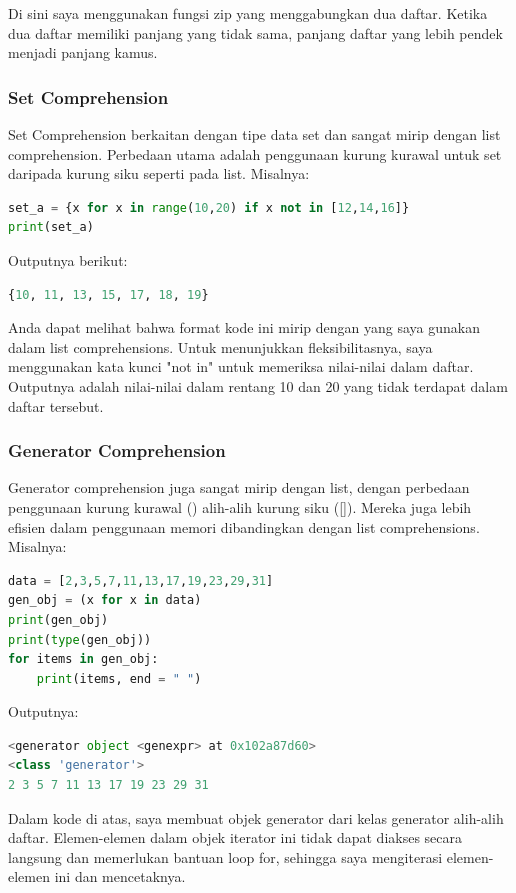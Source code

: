 \documentclass{article}
\begin{document}
Di sini saya menggunakan fungsi zip yang menggabungkan dua daftar. Ketika dua daftar memiliki panjang yang tidak sama, panjang daftar yang lebih pendek menjadi panjang kamus.

\subsubsection{Set Comprehension}
Set Comprehension berkaitan dengan tipe data set dan sangat mirip dengan list comprehension. Perbedaan utama adalah penggunaan kurung kurawal untuk set daripada kurung siku seperti pada list. Misalnya:
\begin{lstlisting}[language=Python, caption={}, captionpos=b]
set_a = {x for x in range(10,20) if x not in [12,14,16]}
print(set_a)
\end{lstlisting}
Outputnya berikut:
\begin{lstlisting}[language=Python, caption={}, captionpos=b]
{10, 11, 13, 15, 17, 18, 19}
\end{lstlisting}


Anda dapat melihat bahwa format kode ini mirip dengan yang saya gunakan dalam list comprehensions. Untuk menunjukkan fleksibilitasnya, saya menggunakan kata kunci "not in" untuk memeriksa nilai-nilai dalam daftar. Outputnya adalah nilai-nilai dalam rentang 10 dan 20 yang tidak terdapat dalam daftar tersebut.

\subsubsection{Generator Comprehension}
Generator comprehension juga sangat mirip dengan list, dengan perbedaan penggunaan kurung kurawal ({}) alih-alih kurung siku ([]). Mereka juga lebih efisien dalam penggunaan memori dibandingkan dengan list comprehensions. Misalnya:
\begin{lstlisting}[language=Python, caption={}, captionpos=b]
data = [2,3,5,7,11,13,17,19,23,29,31]
gen_obj = (x for x in data)
print(gen_obj)
print(type(gen_obj))
for items in gen_obj:
    print(items, end = " ")
\end{lstlisting}
Outputnya:
\begin{lstlisting}[language=Python, caption={}, captionpos=b]
<generator object <genexpr> at 0x102a87d60> 
<class 'generator'> 
2 3 5 7 11 13 17 19 23 29 31 
\end{lstlisting}

Dalam kode di atas, saya membuat objek generator dari kelas generator alih-alih daftar. Elemen-elemen dalam objek iterator ini tidak dapat diakses secara langsung dan memerlukan bantuan loop for, sehingga saya mengiterasi elemen-elemen ini dan mencetaknya.
\end{document}
